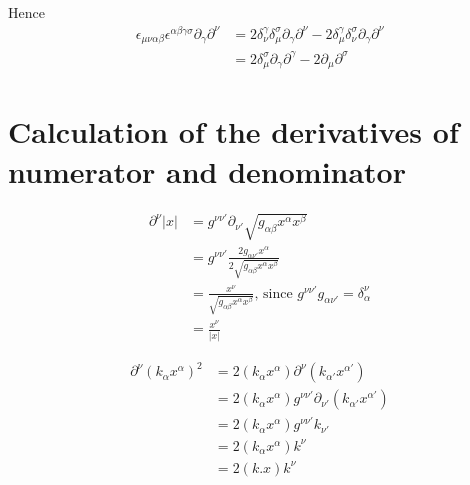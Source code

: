 \documentclass[10pt,a4paper]{article}
\begin{document}
	Hence
	\begin{align}
	\epsilon_{\mu\nu\alpha\beta}\epsilon^{\alpha\beta\gamma\sigma}\partial_{\gamma}\partial^{\nu}&=2\delta_{\nu}^{\gamma}\delta_{\mu}^{\sigma}\partial_{\gamma}\partial^{\nu} - 2 \delta_{\mu}^{\gamma}\delta_{\nu}^{\sigma}\partial_{\gamma}\partial^{\nu}\\
	&=2\delta_{\mu}^{\sigma}\partial_{\gamma}\partial^{\gamma}-2\partial_{\mu}\partial^{\sigma} \label{partials}
	\end{align}

	\section{Calculation of the derivatives of numerator and denominator}
	\begin{align} 
	\partial^{\nu} \lvert x \rvert &= g^{\nu\nu'}\partial_{\nu'}\sqrt{g_{\alpha\beta}x^{\alpha}x^{\beta}}\\
	&=g^{\nu\nu'}\frac{2 g_{\alpha\nu'} x^{\alpha}}{2 \sqrt{g_{\alpha\beta}x^{\alpha}x^{\beta}}}\\
	&=\frac{x^{\nu}}{\sqrt{g_{\alpha\beta}x^{\alpha}x^{\beta}}} \text {, since } g^{\nu\nu'}g_{\alpha\nu'}=\delta^{\nu}_{\alpha}\\
	&=\frac{x^{\nu}}{\lvert x \rvert}\label{numerator}
	\end{align}
	
	\begin{align}
	\partial^{\nu}(k_{\alpha}x^{\alpha})^{2} &= 2 (k_{\alpha}x^{\alpha}) \partial^{\nu} (k_{\alpha'}x^{\alpha'})\\
	&= 2 (k_{\alpha}x^{\alpha}) g^{\nu\nu'}\partial_{\nu'}(k_{\alpha'}x^{\alpha'}) \\
	&= 2 (k_{\alpha}x^{\alpha}) g^{\nu\nu'}k_{\nu'}\\
	&= 2 (k_{\alpha}x^{\alpha}) k^{\nu} \\
	&= 2(k.x)k^{\nu} \label{denominator}
	\end{align}
\end{document}
